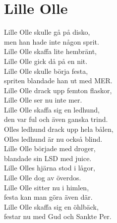 \section{Lille Olle}
Lille Olle skulle gå på disko,\\
men han hade inte någon sprit.\\
Lille Olle skaffa lite hembränt,\\
Lille Olle gick då på en nit.\\

Lille Olle skulle börja festa,\\
spriten blandade han ut med MER.\\
Lille Olle drack upp femton flaskor,\\
Lille Olle ser nu inte mer.\\

Lille Olle skaffa sig en ledhund,\\
den var ful och även ganska trind.\\
Olles ledhund drack upp hela bålen,\\
Olles ledhund är nu också blind.\\

Lille Olle började med droger,\\
blandade sin LSD med juice.\\
Lille Olles hjärna stod i lågor,\\
Lille Olle dog av överdos.\\

Lille Olle sitter nu i himlen,\\
festa kan man göra även där.\\
Lille Olle skaffa sig en öhlbäck,\\
festar nu med Gud och Sankte Per.\\